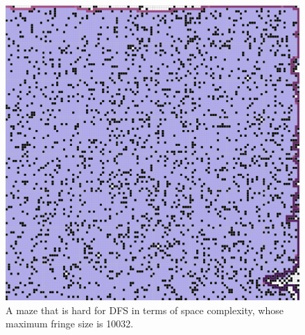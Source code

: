 \documentclass[letter]{article}
\begin{document}
\begin{enumerate}[resume]
\begin{enumerate}
\begin{enumerate}
\begin{figure}
					\includegraphics[width=\textwidth]{../pics/df/10032_2.png}
					\caption{\label{fig:df1}A maze that is hard for DFS in terms of space complexity, whose maximum fringe size is 10032. }
					

\end{figure}
\end{enumerate}
\end{enumerate}
\end{enumerate}
\end{document}
